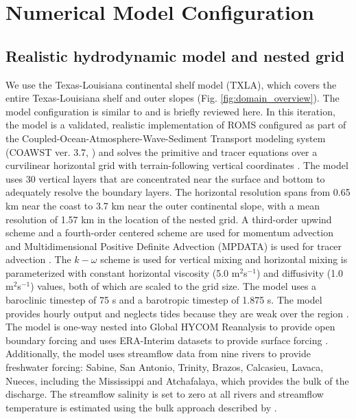 \documentclass[draft]{agujournal2019}
\begin{document}
\section{Numerical Model Configuration} \label{sec:numerical}

\subsection{Realistic hydrodynamic model and nested grid}

We use the Texas-Louisiana continental shelf model (TXLA), which covers the entire Texas-Louisiana shelf and outer slopes (Fig. \ref{fig:domain_overview}). The model configuration is similar to  and is briefly reviewed here. In this iteration, the model is a validated, realistic implementation of ROMS configured as part of the Coupled-Ocean-Atmosphere-Wave-Sediment Transport modeling system (COAWST ver. 3.7, ) and solves the primitive and tracer equations over a curvilinear horizontal grid with terrain-following vertical coordinates \cite{Arakawa_1977, shchepetkin2005regional, Zhang_2012_forecast}. The model uses 30 vertical layers that are concentrated near the surface and bottom to adequately resolve the boundary layers. The horizontal resolution spans from 0.65 km near the coast to 3.7 km near the outer continental slope, with a mean resolution of 1.57 km in the location of the nested grid. A third-order upwind scheme and a fourth-order centered scheme are used for momentum advection and Multidimensional Positive Definite Advection (MPDATA) is used for tracer advection \cite{Smolarkiewicz_1998}. The $k-\omega$ scheme is used for vertical mixing \cite{Warner_2005} and horizontal mixing is parameterized with constant horizontal viscosity (5.0 m$^2$s$^{-1}$) and diffusivity (1.0 m$^2$s$^{-1}$) values, both of which are scaled to the grid size. The model uses a baroclinic timestep of 75 s and a barotropic timestep of 1.875 s. The model provides hourly output and neglects tides because they are weak over the region \cite{DiMarco_1998}. The model is one-way nested into Global HYCOM Reanalysis to provide open boundary forcing and uses ERA-Interim datasets to provide surface forcing \cite{Dee_2011}. Additionally, the model uses streamflow data from nine rivers to provide freshwater forcing: Sabine, San Antonio, Trinity, Brazos, Calcasieu, Lavaca, Nueces, including the Mississippi and Atchafalaya, which provides the bulk of the discharge. The streamflow salinity is set to zero at all rivers and streamflow temperature is estimated using the bulk approach described by .
\end{document}
